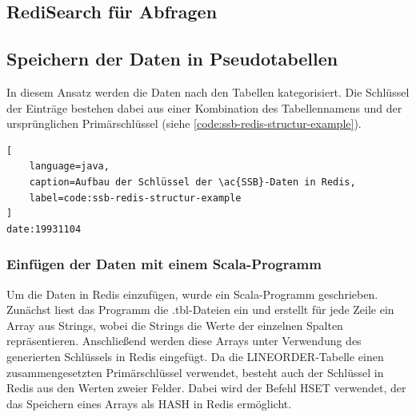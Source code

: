 \subsection{RediSearch für Abfragen}


\subsection{Speichern der Daten in Pseudotabellen}
In diesem Ansatz werden die Daten nach den Tabellen kategorisiert.
Die Schlüssel der Einträge bestehen dabei aus einer Kombination des Tabellennamens und der ursprünglichen Primärschlüssel (siehe \cref{code:ssb-redis-structur-example}).

\begin{lstlisting}[
    language=java,
    caption=Aufbau der Schlüssel der \ac{SSB}-Daten in Redis,
    label=code:ssb-redis-structur-example
]
date:19931104
\end{lstlisting}

\subsubsection{Einfügen der Daten mit einem Scala-Programm}
Um die Daten in Redis einzufügen, wurde ein Scala-Programm geschrieben.
Zunächst liest das Programm die .tbl-Dateien ein und erstellt für jede Zeile ein Array aus Strings, wobei die Strings die Werte der einzelnen Spalten repräsentieren.
Anschließend werden diese Arrays unter Verwendung des generierten Schlüssels in Redis eingefügt.
Da die LINEORDER-Tabelle einen zusammengesetzten Primärschlüssel verwendet, besteht auch der Schlüssel in Redis aus den Werten zweier Felder.
Dabei wird der Befehl HSET verwendet, der das Speichern eines Arrays als HASH in Redis ermöglicht.

